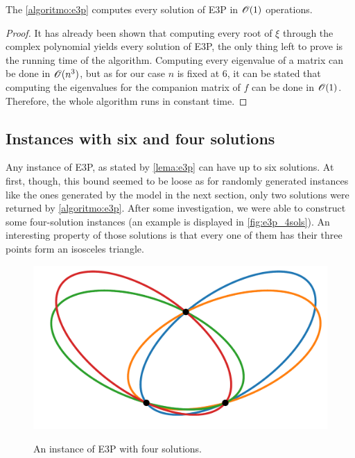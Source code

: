 \begin{teorema}\label{th:e3p}
	The \autoref{algoritmo:e3p} computes every solution of E3P in $\mathscr{O}(1)$ operations.
\end{teorema}

\begin{proof}
	It has already been shown that computing every root of $\xi$ through the complex polynomial yields every solution of E3P, the only thing left to prove is the running time of the algorithm.
	Computing every eigenvalue of a matrix can be done in $\mathscr{O}(n^3)$, but as for our case $n$ is fixed at $6$, it can be stated that computing the eigenvalues for the companion matrix of $f$ can be done in $\mathscr{O}(1)$. Therefore, the whole algorithm runs in constant time.
\end{proof}

\subsection{Instances with six and four solutions}

Any instance of E3P, as stated by \autoref{lema:e3p} can have up to six solutions. At first, though, this bound seemed to be loose as for randomly generated instances like the ones generated by the model in the next section, only two solutions were returned by \autoref{algoritmo:e3p}.
After some investigation, we were able to construct some four-solution instances (an example is displayed in \autoref{fig:e3p_4sols}). An interesting property of those solutions is that every one of them has their three points form an isosceles triangle.

\begin{figure}[H]
	\centering
	\caption{An instance of E3P with four solutions.}
	\includegraphics[scale=.35]{tex/figures/e3p_4sols}
	\fautor
	\label{fig:e3p_4sols}
\end{figure}

